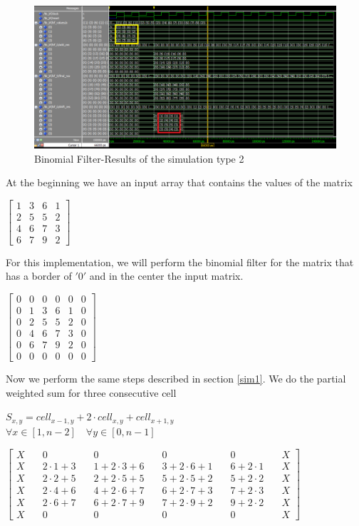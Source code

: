 	  
	  \begin{figure}[h!]
	  	\centering	
	  	\includegraphics[width=\textwidth]{imm/bf/bfwavev2.png}  
	  	\caption{Binomial Filter-Results of the simulation type 2} 
	  	\label{fig:tb_bf2}
	  	\end{figure}
	At the beginning we have an input array that contains the values of the matrix   \begin{center}
		$ \begin{bmatrix}
		1 & 3 & 6 & 1\\
		2 & 5 & 5 & 2   	\\
		4&6 & 7 & 3\\
		6&7 & 9 & 2
		\end{bmatrix}$
	\end{center}
	For this implementation, we will perform the binomial filter for the matrix that has a border of  $ '0' $ and in the center the input matrix.
	 \begin{center}
	 	$ \begin{bmatrix}
	 	0&0 &0  &0  & 0&0\\
	 	0&1 & 3 & 6 & 1&0\\
	 	0&2 & 5 & 5 & 2  &0 	\\
	 0&	4&6 & 7 & 3&0\\
	 0&	6&7 & 9 & 2&0\\
	 	0&0 &0  &0  & 0&0
	 	\end{bmatrix}$
	 	 \end{center}
Now we perform the same steps described in section \ref{sim1}.	
We do the partial weighted sum for three consecutive cell
\begin{center}
	$ S_{x,y}=cell_{x-1,y}+2\cdot cell_{x,y}+cell_{x+1,y}$\\
	$  \forall x\in [1,n-2] \quad\forall y\in[0,n-1]$
\end{center} 	 
	\begin{center}
		$ \begin{bmatrix}
		X&0&0&0&0&X\\
		X\quad&2\cdot1+3\quad & 1+2\cdot3+6 \quad& 3+2\cdot6+1\quad & 6+2\cdot1\quad&X\\
		X\quad&2\cdot2+5\quad & 2+2\cdot5+5 \quad& 5+2\cdot5+2\quad & 5+2\cdot2  \quad&X 	\\
		X\quad&2\cdot4+6\quad&4+2\cdot6+7 \quad& 6+2\cdot7+3\quad & 7+2\cdot3\quad&X\\
		X\quad&2\cdot6+7\quad&6+2\cdot7+9 \quad& 7+2\cdot9+2\quad & 9+2\cdot2\quad&X\\
		X&0&0&0&0&X
		\end{bmatrix}$
	\end{center}
